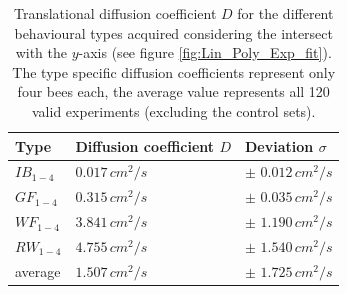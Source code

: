 \begin{center}
\vspace{-2mm}
\begin{table}[H]
\caption{Translational diffusion coefficient $D$ for the different behavioural types acquired considering the intersect with the $y$-axis (see figure \ref{fig:Lin_Poly_Exp_fit}). The type specific diffusion coefficients represent only four bees each, the average value represents all 120 valid experiments (excluding the control sets).}
    \centering
    \begin{tabular}{p{1.2cm}|p{3.8cm}|p{4.0cm}}
         \textbf{Type} & \textbf{Diffusion coefficient $D$} & \textbf{Deviation $\sigma$} \\
         \hline
         \hline
         $IB_{1-4}$ & $0.017 \,cm^{2}/s$ & $\pm$ $0.012 \,cm^{2}/s$  \\
         $GF_{1-4}$ & $0.315 \,cm^{2}/s$ & $\pm$ $0.035 \,cm^{2}/s$  \\
         $WF_{1-4}$ & $3.841 \,cm^{2}/s$ & $\pm$ $1.190 \,cm^{2}/s$  \\
         $RW_{1-4}$ & $4.755 \,cm^{2}/s$ & $\pm$ $1.540 \,cm^{2}/s$  \\
         average & $1.507 \, cm^{2}/s$ & $\pm$ $1.725 \,cm^{2}/s$  \\
    \end{tabular}
    \label{tab:D_inter}
    \vspace{-10mm}
\end{table}
\end{center}


